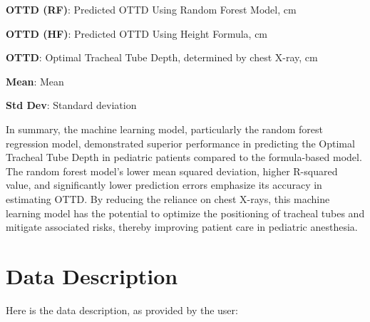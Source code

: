 \documentclass[11pt]{article}
\begin{document}
\begin{table}[h]
\caption{Summary Statistics for Actual and Predicted OTTD for Both Models}
\label{table:summary_stat}
\begin{threeparttable}
\renewcommand{\TPTminimum}{\linewidth}
\begin{tablenotes}
\footnotesize
\item \textbf{OTTD (RF)}: Predicted OTTD Using Random Forest Model, cm
\item \textbf{OTTD (HF)}: Predicted OTTD Using Height Formula, cm
\item \textbf{OTTD}: Optimal Tracheal Tube Depth, determined by chest X-ray, cm
\item \textbf{Mean}: Mean
\item \textbf{Std Dev}: Standard deviation
\end{tablenotes}
\end{threeparttable}
\end{table}


In summary, the machine learning model, particularly the random forest regression model, demonstrated superior performance in predicting the Optimal Tracheal Tube Depth in pediatric patients compared to the formula-based model. The random forest model's lower mean squared deviation, higher R-squared value, and significantly lower prediction errors emphasize its accuracy in estimating OTTD. By reducing the reliance on chest X-rays, this machine learning model has the potential to optimize the positioning of tracheal tubes and mitigate associated risks, thereby improving patient care in pediatric anesthesia.


\clearpage
\appendix

\section{Data Description} \label{sec:data_description} Here is the data description, as provided by the user:
\end{document}
